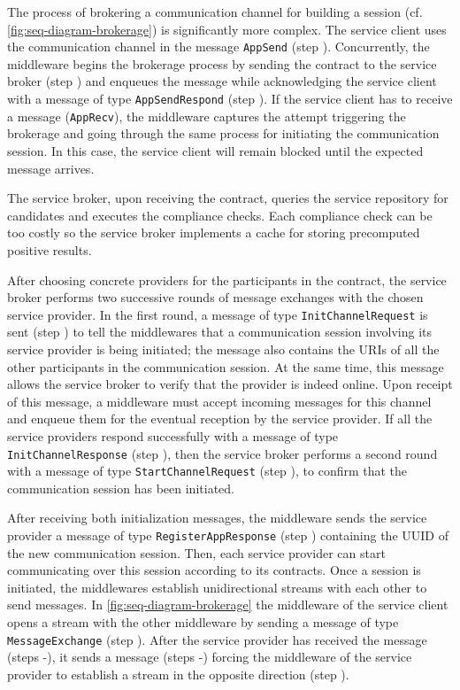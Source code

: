 The process of brokering a communication channel for building a
session (cf. \cref{fig:seq-diagram-brokerage}) is significantly more
complex.
%
The service client uses the communication channel in the message
\texttt{AppSend} (step ).
%
Concurrently, the middleware begins the brokerage
process by sending the contract to the service broker 
(step ) and
%
enqueues the message while acknowledging the service client with a
message of type \texttt{AppSendRespond} (step ).
%
If the service client has to receive a message (\texttt{AppRecv}), the
middleware captures the attempt triggering the brokerage and going
through the same process for initiating the communication session.
%
In this case, the service client will remain blocked until the
expected message arrives.

The service broker, upon receiving the contract, queries the service
repository for candidates and executes the compliance checks.
%
Each compliance check can be too costly so the service broker
implements a cache for storing precomputed positive results.

After choosing concrete providers for the participants in the
contract, the service broker performs two successive rounds of
message exchanges with the chosen service provider.
%
In the first round, a message of type \texttt{InitChannelRequest} is
sent (step ) to tell the middlewares that a
communication session involving its service provider is being
initiated; the message also contains the URIs of all the other
participants in the communication session.
%
At the same time, this message allows the service broker to verify
that the provider is indeed online.
%
Upon receipt of this message, a middleware must accept
incoming messages for this channel and enqueue them for the eventual
reception by the service provider.
%
If all the service providers respond successfully with a message of
type \texttt{InitChannelResponse} (step ), then the service
broker performs a second round with a message of type
\texttt{StartChannelRequest} (step ), to confirm that the
communication session has been initiated.

After receiving both initialization messages, the middleware
sends the service provider a message of type
\texttt{RegisterAppResponse} (step ) containing the UUID
of the new communication session.
%
Then, each service provider can start communicating over this session
according to its contracts.
%
Once a session is initiated, the middlewares establish
unidirectional streams with each other to send messages.
%
In \cref{fig:seq-diagram-brokerage} the middleware of the
service client opens a stream with the other middleware by
sending a message of type \texttt{MessageExchange} (step
{\scriptsize{}}).
%
After the service provider has received the message (steps
-), it sends a
message (steps -)
forcing the middleware of the service provider to establish a stream
in the opposite direction (step {\scriptsize{}}).

